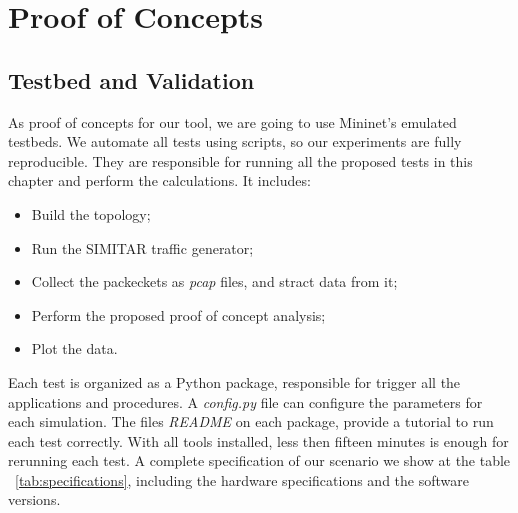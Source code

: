 \chapter{Proof of Concepts}\label{ch:validation}


\section{Testbed and Validation}


As proof of concepts for our tool, we are going to use Mininet's emulated testbeds. We automate all tests using scripts, so our experiments are fully reproducible. They are responsible for running all the proposed tests in this chapter and perform the calculations. It includes:

\begin{itemize}
    \item Build the topology;
    \item Run the SIMITAR traffic generator;
    \item Collect the packeckets as \textit{pcap} files, and stract data from it;
    \item Perform the proposed proof of concept analysis;
    \item Plot the data.
\end{itemize}

Each test is organized as a Python package, responsible for trigger all the applications and procedures. A \textit{config.py} file can configure the parameters for each simulation. The files \textit{README} on each package, provide a tutorial to run each test correctly. With all tools installed, less then fifteen minutes is enough for rerunning each test. A complete specification of our scenario we show at the table ~\ref{tab:specifications}, including the hardware specifications and the software versions. 

